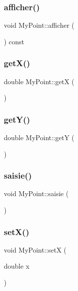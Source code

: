 \subsubsection{\texorpdfstring{afficher()}{afficher()}}
{\footnotesize\ttfamily void My\+Point\+::afficher (\begin{DoxyParamCaption}{ }\end{DoxyParamCaption}) const}

\mbox{\label{classMyPoint_aa9e91ac26c7499b627a0b2bed467ff16}} 
\subsubsection{\texorpdfstring{get\+X()}{getX()}}
{\footnotesize\ttfamily double My\+Point\+::getX (\begin{DoxyParamCaption}{ }\end{DoxyParamCaption})}

\mbox{\label{classMyPoint_a23b042effe628a6aea0f93d922892953}} 
\subsubsection{\texorpdfstring{get\+Y()}{getY()}}
{\footnotesize\ttfamily double My\+Point\+::getY (\begin{DoxyParamCaption}{ }\end{DoxyParamCaption})}

\mbox{\label{classMyPoint_a8d15eb173641e8c2c9a783eb8776dd0c}} 
\subsubsection{\texorpdfstring{saisie()}{saisie()}}
{\footnotesize\ttfamily void My\+Point\+::saisie (\begin{DoxyParamCaption}{ }\end{DoxyParamCaption})}

\mbox{\label{classMyPoint_a927c5f22cda376e37b6432400ca23d07}} 
\subsubsection{\texorpdfstring{set\+X()}{setX()}}
{\footnotesize\ttfamily void My\+Point\+::setX (\begin{DoxyParamCaption}\item[{double}]{x }\end{DoxyParamCaption})\hspace{0.3cm}{\ttfamily [inline]}}

